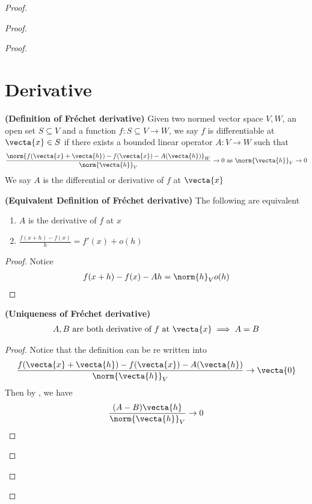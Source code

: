 \documentclass{report}
\begin{document}
\begin{proof}
\begin{proof}
\begin{proof}
\section{Derivative}
\begin{definition}
\label{5.1.1}
\textbf{(Definition of Fréchet derivative)} Given two normed vector space $V,W$, an open set $S\subseteq V$ and a function  $f:S\subseteq V\rightarrow W$, we say $f$ is differentiable at  $\vecta{x}\in S$ if there exists a bounded linear operator $A:V\rightarrow W$ such that 
\begin{align*}
 \frac{\norm{f(\vecta{x}+\vecta{h})-f(\vecta{x})-A(\vecta{h})}_W}{\norm{\vecta{h}}_V} \to 0 \text{ as  }\norm{\vecta{h}}_V \to 0
\end{align*}
We say $A$ is the differential or derivative of  $f$ at  $\vecta{x}$
\end{definition}
\begin{theorem}
\label{5.1.2}
\textbf{(Equivalent Definition of Fréchet derivative)} The following are equivalent 
\begin{enumerate}[label=(\alph*)]
  \item $A$ is the derivative of  $f$ at  $x$
  \item  $\frac{f(x+h)-f(x)}{h}=f'(x)+o(h)$ 
\end{enumerate}
\end{theorem}
\begin{proof}
Notice 
\begin{align*}
f(x+h)-f(x)-Ah =\norm{h}_V o(h)
\end{align*}
\end{proof}
\begin{theorem}
\label{5.1.3}
\textbf{(Uniqueness of Fréchet derivative)} 
\begin{align*}
A,B\text{ are both derivative of $f$ at $\vecta{x}$}\implies A=B
\end{align*}
\end{theorem}
\begin{proof}
Notice that the definition can be re written into 
\begin{align*}
\frac{f(\vecta{x}+\vecta{h})-f(\vecta{x})-A(\vecta{h})}{\norm{\vecta{h}}_V} \to \vecta{0}
\end{align*}
Then by , we have 
\begin{align*}
\frac{(A-B)\vecta{h}}{\norm{\vecta{h}}_V}\to 0

\end{align*}
\end{proof}
\end{proof}
\end{proof}
\end{proof}
\end{document}
